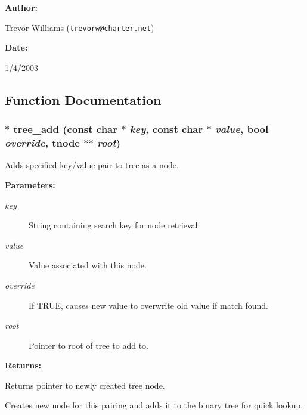 \begin{Desc}
\item[{\bf Author: }]\par
Trevor Williams ({\tt trevorw@charter.net}) \end{Desc}
\begin{Desc}
\item[{\bf Date: }]\par
1/4/2003

\end{Desc}


\subsection{Function Documentation}
\subsubsection{$\ast$ tree\_\-add (const char $\ast$ {\em key}, const char $\ast$ {\em value}, {\bf bool} {\em override}, {\bf tnode} $\ast$$\ast$ {\em root})}\label{tree_8h_a0}


Adds specified key/value pair to tree as a node.

\begin{Desc}
\item[{\bf Parameters: }]\par
\begin{description}
\item[
{\em key}]String containing search key for node retrieval. \item[
{\em value}]Value associated with this node. \item[
{\em override}]If TRUE, causes new value to overwrite old value if match found. \item[
{\em root}]Pointer to root of tree to add to.

\end{description}
\end{Desc}
\begin{Desc}
\item[{\bf Returns: }]\par
Returns pointer to newly created tree node.

\end{Desc}
Creates new node for this pairing and adds it to the binary tree for quick lookup. 
